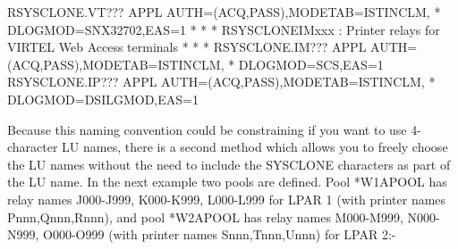 \documentclass[letterpaper,10pt,english]{sphinxmanual}
\begin{document}
\begin{sphinxVerbatim}[commandchars=\\\{\}]
R\PYGZam{}SYSCLONE.VT??? APPL AUTH=(ACQ,PASS),MODETAB=ISTINCLM,               *
      DLOGMOD=SNX32702,EAS=1
* \PYGZhy{}\PYGZhy{}\PYGZhy{}\PYGZhy{}\PYGZhy{}\PYGZhy{}\PYGZhy{}\PYGZhy{}\PYGZhy{}\PYGZhy{}\PYGZhy{}\PYGZhy{}\PYGZhy{}\PYGZhy{}\PYGZhy{}\PYGZhy{}\PYGZhy{}\PYGZhy{}\PYGZhy{}\PYGZhy{}\PYGZhy{}\PYGZhy{}\PYGZhy{}\PYGZhy{}\PYGZhy{}\PYGZhy{}\PYGZhy{}\PYGZhy{}\PYGZhy{}\PYGZhy{}\PYGZhy{}\PYGZhy{}\PYGZhy{}\PYGZhy{}\PYGZhy{}\PYGZhy{}\PYGZhy{}\PYGZhy{}\PYGZhy{}\PYGZhy{}\PYGZhy{}\PYGZhy{}\PYGZhy{}\PYGZhy{}\PYGZhy{}\PYGZhy{}\PYGZhy{}\PYGZhy{}\PYGZhy{}\PYGZhy{}\PYGZhy{}\PYGZhy{}\PYGZhy{}\PYGZhy{}\PYGZhy{}\PYGZhy{}\PYGZhy{}\PYGZhy{}\PYGZhy{}\PYGZhy{}\PYGZhy{}\PYGZhy{}\PYGZhy{}\PYGZhy{}\PYGZhy{}\PYGZhy{} *
* R\PYGZam{}SYSCLONEIMxxx : Printer relays for VIRTEL Web Access terminals   *
* \PYGZhy{}\PYGZhy{}\PYGZhy{}\PYGZhy{}\PYGZhy{}\PYGZhy{}\PYGZhy{}\PYGZhy{}\PYGZhy{}\PYGZhy{}\PYGZhy{}\PYGZhy{}\PYGZhy{}\PYGZhy{}\PYGZhy{}\PYGZhy{}\PYGZhy{}\PYGZhy{}\PYGZhy{}\PYGZhy{}\PYGZhy{}\PYGZhy{}\PYGZhy{}\PYGZhy{}\PYGZhy{}\PYGZhy{}\PYGZhy{}\PYGZhy{}\PYGZhy{}\PYGZhy{}\PYGZhy{}\PYGZhy{}\PYGZhy{}\PYGZhy{}\PYGZhy{}\PYGZhy{}\PYGZhy{}\PYGZhy{}\PYGZhy{}\PYGZhy{}\PYGZhy{}\PYGZhy{}\PYGZhy{}\PYGZhy{}\PYGZhy{}\PYGZhy{}\PYGZhy{}\PYGZhy{}\PYGZhy{}\PYGZhy{}\PYGZhy{}\PYGZhy{}\PYGZhy{}\PYGZhy{}\PYGZhy{}\PYGZhy{}\PYGZhy{}\PYGZhy{}\PYGZhy{}\PYGZhy{}\PYGZhy{}\PYGZhy{}\PYGZhy{}\PYGZhy{}\PYGZhy{}\PYGZhy{} *
R\PYGZam{}SYSCLONE.IM??? APPL AUTH=(ACQ,PASS),MODETAB=ISTINCLM,               *
      DLOGMOD=SCS,EAS=1
R\PYGZam{}SYSCLONE.IP??? APPL AUTH=(ACQ,PASS),MODETAB=ISTINCLM,               *
      DLOGMOD=DSILGMOD,EAS=1
\end{sphinxVerbatim}

Because this naming convention could be constraining if you want to use 4-character LU names, there is a second method which allows you to freely choose the LU names without the need to include the SYSCLONE characters as part of the LU name. In the next example two pools are defined. Pool *W1APOOL has relay names J000-J999, K000-K999, L000-L999 for LPAR 1 (with printer names Pnnn,Qnnn,Rnnn), and pool *W2APOOL has relay names M000-M999, N000-N999, O000-O999 (with printer names Snnn,Tnnn,Unnn) for LPAR 2:-
\end{document}
